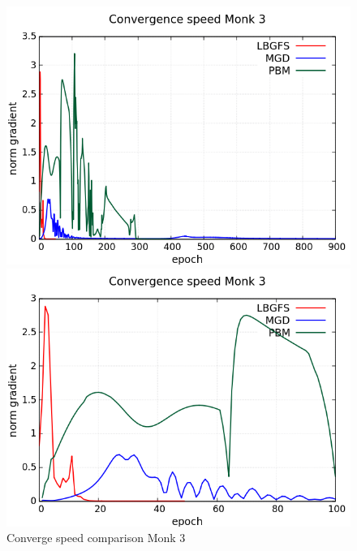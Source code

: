\begin{figure}[H]
	\centering
	\begin{minipage}[t]{0.5\linewidth}
		\includegraphics[width=\linewidth]{data/Comparison/Monk3/Monk3_CS_Comparison_standard.png}
	\end{minipage}%
	\begin{minipage}[t]{0.5\linewidth}
		\includegraphics[width=\linewidth]{data/Comparison/Monk3/Monk3_CS_Comparison_zoom.png}
	\end{minipage}
	\caption{Converge speed comparison Monk 3}
	\label{CS-Monk3}
\end{figure}
